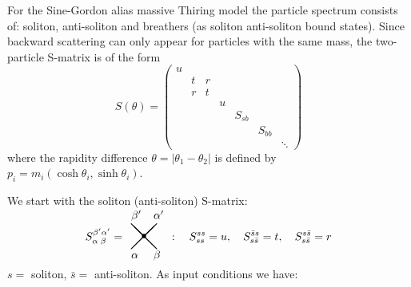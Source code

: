 \documentclass[a4paper,12pt]{article}
\begin{document}
For the Sine-Gordon alias massive Thiring model the particle spectrum
consists of: soliton, anti-soliton and breathers (as soliton anti-soliton
bound states). Since backward scattering can only appear for particles with
the same mass, the two-particle S-matrix is of the form 
\[
S(\theta )=\left( 
\begin{array}{ccccccc}
u &  &  &  &  &  &  \\ 
& t & r &  &  &  &  \\ 
& r & t &  &  &  &  \\ 
&  &  & u &  &  &  \\ 
&  &  &  & S_{sb} &  &  \\ 
&  &  &  &  & S_{bb} &  \\ 
&  &  &  &  &  & \ddots
\end{array}
\right) 
\]
where the rapidity difference $\theta =|\theta _{1}-\theta _{2}|$ is defined
by\newline
$p_{i}=m_{i}(\cosh \theta _{i},\sinh \theta _{i})$.

We start with the soliton (anti-soliton) S-matrix: 
\[
S_{\alpha \;\beta }^{\beta ^{\prime }\alpha ^{\prime }}= 
\begin{array}{c}
\unitlength2mm\begin{picture}(5,6.3) \thicklines \put(0,1){\line(1,1){4}}
\put(2,3){\makebox(0,0){$\bullet$}} \put(4,1){\line(-1,1){4}}
\put(0,-.5){$\alpha$} \put(3.5,-.5){$\beta$} \put(3.5,5.8){$\alpha'$}
\put(0,5.8){$\beta'$} \end{picture}
\end{array}
:\quad S_{ss}^{ss}=u,\quad S_{s\bar{s}}^{\bar{s}s}=t,\quad S_{s\bar{s}}^{s%
\bar{s}}=r 
\]
$s=$ soliton, $\bar{s}=$ anti-soliton. As input conditions we have:
\end{document}
